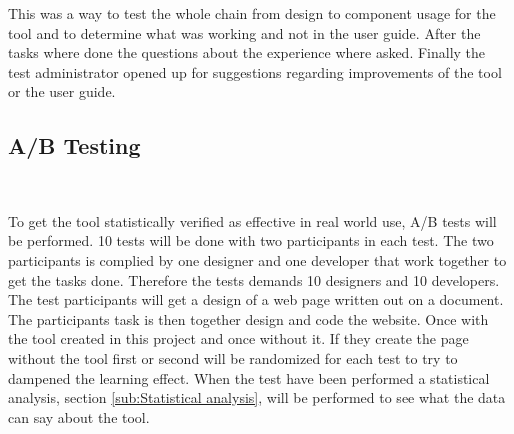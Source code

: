 This was a way to test the whole chain from design to component usage for the tool and to determine what was working and not in the user guide. After the tasks where done the questions about the experience where asked. Finally the test administrator opened up for suggestions regarding improvements of the tool or the user guide. 


\subsection{ A/B Testing }%
\label{sub:ab-testing}

\\

To get the tool statistically verified as effective in real world use, A/B tests will be performed. 10 tests will be done with two participants in each test. The two participants is complied by one designer and one developer that work together to get the tasks done. Therefore the tests demands 10 designers and 10 developers. The test participants will get a design of a web page written out on a document. The participants task is then together design and code the website. Once with the tool created in this project and once without it. If they create the page without the tool first or second will be randomized for each test to try to dampened the learning effect. When the test have been performed a statistical analysis, section \ref{sub:Statistical analysis}, will be performed to see what the data can say about the tool.
